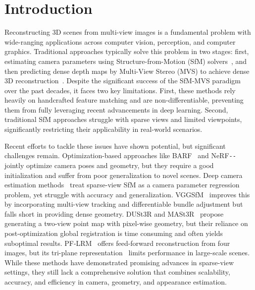\section{Introduction}\label{sec::intro}
Reconstructing 3D scenes from multi-view images is a fundamental problem with wide-ranging applications across computer vision, perception, and computer graphics. 
Traditional approaches typically solve this problem in two stages: first, estimating camera parameters using Structure-from-Motion (SfM) solvers~\citep{hartley2003multiple, schonberger2016structure, snavely2006photo}, and then predicting dense depth maps by Multi-View Stereo (MVS) to achieve dense 3D reconstruction~\citep{seitz2006comparison, schonberger2016pixelwise}. 
% 
Despite the significant success of the SfM-MVS paradigm over the past decades, it faces two key limitations. First, these methods rely heavily on handcrafted feature matching and are non-differentiable, preventing them from fully leveraging recent advancements in deep learning. Second, traditional SfM approaches struggle with sparse views and limited viewpoints, significantly restricting their applicability in real-world scenarios. 


Recent efforts to tackle these issues have shown potential, but significant challenges remain.  Optimization-based approaches like BARF~\citep{lin2021barf} and NeRF\texttt{-}\texttt{-}\citep{wang2021nerf} jointly optimize camera poses and geometry, but they require a good initialization and suffer from poor generalization to novel scenes. 
% 
Deep camera estimation methods~\citep{sinha2023sparsepose, wang2023posediffusion, lin2023relposepp, zhang2024cameras, Rockwell2024, Rockwell2022} treat sparse-view SfM as a camera parameter regression problem, yet struggle with accuracy and generalization. VGGSfM~\citep{wang2024vggsfm} improves this by incorporating multi-view tracking and differentiable bundle adjustment but falls short in providing dense geometry.
% 
DUSt3R\citep{wang2024dust3r} and MASt3R~\citep{leroy2024grounding} propose generating a two-view point map with pixel-wise geometry, but their reliance on post-optimization global registration is time consuming and often yields suboptimal results. PF-LRM~\citep{wang2023pf} offers feed-forward reconstruction from four images, but its tri-plane representation~\cite{chan2022efficient} limits performance in large-scale scenes.
While these methods have demonstrated promising advances in sparse-view settings, they still lack a comprehensive solution that combines scalability, accuracy, and efficiency in camera, geometry, and appearance estimation.
     
